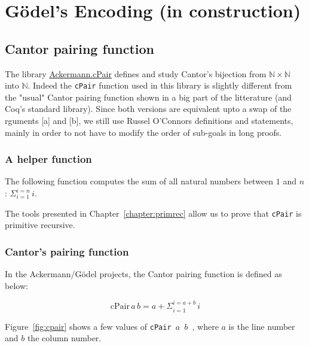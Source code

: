 \chapter{G\"{o}del's Encoding (in construction)}
\label{chap:encoding}


\section{Cantor pairing function}

The library \href{../theories/html/hydras.Ackermann.cPair.html}{Ackermann.cPair} defines and study Cantor's bijection from
$\mathbb{N}\times\mathbb{N}$ into $\mathbb{N}$.
Indeed the \texttt{cPair} function used in this library
 is slightly different 
     from the "usual" Cantor pairing function shown in  a big part 
     of the litterature (and Coq's standard library). 
      Since both versions are equivalent upto a swap of the 
      rguments [a] and [b], we still use  Russel O'Connors definitions and statements, mainly in order to not have to modify the order of sub-goals in long proofs.


      \subsection{A helper function}

      The following function computes the sum of all natural numbers between $1$ and $n$: $\Sigma_{i=1}^{i=n}\,i$.

      


      The tools presented in Chapter~\ref{chapter:primrec} allow us to prove that \texttt{cPair} is primitive recursive.

      
      \subsection{Cantor's pairing function}

      In the Ackermann/G\"{o}del projects, the Cantor pairing function is defined as below:

      $$\textrm{cPair}\,a\,b = a+ \Sigma_{i=1}^{i=a+b}\,i$$


      Figure~\ref{fig:cpair} shows a few values of
      \texttt{cPair\,$a$\,$b$ }, where $a$ is the line number and $b$ the column number.


